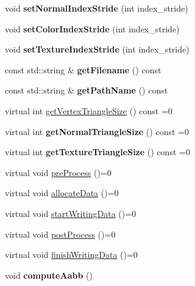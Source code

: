\begin{DoxyCompactItemize}
\item 
\mbox{\label{class_mesh_base_aa3541f6e43c78bf78bada0aed22515e4}} 
void {\bfseries set\+Normal\+Index\+Stride} (int index\+\_\+stride)
\item 
\mbox{\label{class_mesh_base_ae0f218a5d46a946dbd131321f3ecb6c5}} 
void {\bfseries set\+Color\+Index\+Stride} (int index\+\_\+stride)
\item 
\mbox{\label{class_mesh_base_a9406f179533bc966d60ca7a0d8f124b9}} 
void {\bfseries set\+Texture\+Index\+Stride} (int index\+\_\+stride)
\item 
\mbox{\label{class_mesh_base_a3be83f6c6a41e7b786c804eda9b9f247}} 
const std\+::string \& {\bfseries get\+Filename} () const
\item 
\mbox{\label{class_mesh_base_a91f01999b6fa0fe764db833fdf3b17b1}} 
const std\+::string \& {\bfseries get\+Path\+Name} () const
\item 
virtual int \hyperlink{class_mesh_base_a508fde807d380849192391f28465fee4}{get\+Vertex\+Triangle\+Size} () const =0
\item 
\mbox{\label{class_mesh_base_a249856ea8eb734ae36bdf51ea4bdbdd7}} 
virtual int {\bfseries get\+Normal\+Triangle\+Size} () const =0
\item 
\mbox{\label{class_mesh_base_aa8b94fe22c0d261357d2386cf2b5624c}} 
virtual int {\bfseries get\+Texture\+Triangle\+Size} () const =0
\item 
virtual void \hyperlink{class_mesh_base_a25e192211e37cb69f9b5ce9aea25989a}{pre\+Process} ()=0
\item 
virtual void \hyperlink{class_mesh_base_a30c0ef8b3faabc9b41520b85dd9413bb}{allocate\+Data} ()=0
\item 
virtual void \hyperlink{class_mesh_base_a67eb9bc7c4f6b074626078fe7779a8a4}{start\+Writing\+Data} ()=0
\item 
virtual void \hyperlink{class_mesh_base_a49ec1a25d18103982974f424b77fadc0}{post\+Process} ()=0
\item 
virtual void \hyperlink{class_mesh_base_a000796d7b04985f137d5a1368e90bcc6}{finish\+Writing\+Data} ()=0
\item 
\mbox{\label{class_mesh_base_acd4ecf54012593c422da74efb8afd49d}} 
void {\bfseries compute\+Aabb} ()
\end{DoxyCompactItemize}


